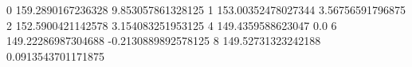 0 159.2890167236328 9.853057861328125
1 153.00352478027344 3.56756591796875
2 152.5900421142578 3.154083251953125
4 149.4359588623047 0.0
6 149.22286987304688 -0.2130889892578125
8 149.52731323242188 0.0913543701171875
